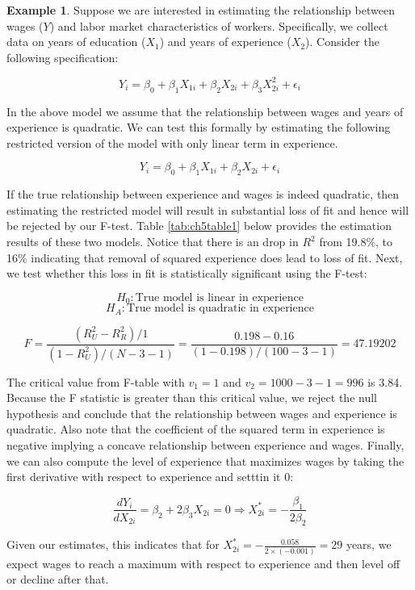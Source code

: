 \documentclass[
]{book}
\theoremstyle{definition}
\theoremstyle{definition}
\newtheorem{example}{Example}[chapter]
\theoremstyle{definition}
\theoremstyle{definition}
\theoremstyle{remark}
\begin{document}
\begin{example}
\protect\hypertarget{exm:unnamed-chunk-23}{}\label{exm:unnamed-chunk-23}Suppose we are interested in estimating the relationship between wages (\(Y\)) and labor market characteristics of workers. Specifically, we collect data on years of education (\(X_1\)) and years of experience (\(X_2\)). Consider the following specification:

\[Y_i= \beta_0 + \beta_1 X_{1i} + \beta_2 X_{2i} + \beta_3 X_{2i}^2 + \epsilon_i\]

In the above model we assume that the relationship between wages and years of experience is quadratic. We can test this formally by estimating the following restricted version of the model with only linear term in experience.

\[Y_i= \beta_0 + \beta_1 X_{1i} + \beta_2 X_{2i} + \epsilon_i\]

If the true relationship between experience and wages is indeed quadratic, then estimating the restricted model will result in substantial loss of fit and hence will be rejected by our F-test. Table \ref{tab:ch5table1} below provides the estimation results of these two models. Notice that there is an drop in \(R^2\) from 19.8\%, to 16\% indicating that removal of squared experience does lead to loss of fit. Next, we test whether this loss in fit is statistically significant using the F-test:

\[H_0: \text{True model is linear in experience} \]
\[H_A: \text{True model is quadratic in experience}\]

\[F=\frac{(R^2_U-R^2_R)/1}{(1-R^2_U)/(N-3-1)}=\frac{0.198-0.16}{(1-0.198)/(100-3-1)}=47.19202\]

The critical value from F-table with \(v_1=1\) and \(v_2=1000-3-1=996\) is 3.84. Because the F statistic is greater than this critical value, we reject the null hypothesis and conclude that the relationship between wages and experience is quadratic. Also note that the coefficient of the squared term in experience is negative implying a concave relationship between experience and wages. Finally, we can also compute the level of experience that maximizes wages by taking the first derivative with respect to experience and setttin it 0:

\[\frac{dY_i}{d X_{2i}}= \beta_2 + 2\beta_3 X_{2i}=0 \Rightarrow X^*_{2i}=-\frac{\beta_1}{2\beta_2}\]

Given our estimates, this indicates that for \(X^*_{2i}=-\displaystyle \frac{0.058}{2\times (-0.001)}=29\) years, we expect wages to reach a maximum with respect to experience and then level off or decline after that.
\end{example}
\end{document}
